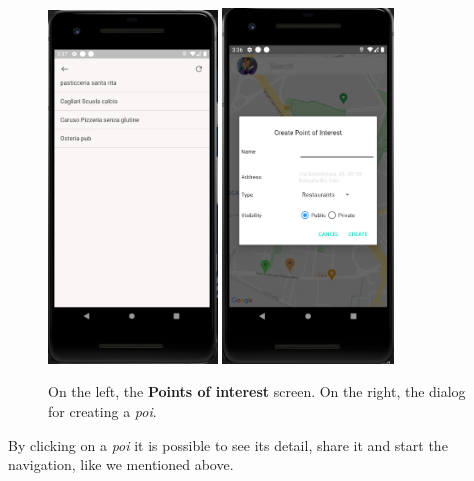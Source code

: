 \documentclass[../../main]{subfiles}
\begin{document}
\begin{figure}[H]
    \centering
    \includegraphics[width=0.4\textwidth]{images/app/poi/poi_overview}
    \includegraphics[width=0.405\textwidth]{images/app/poi/creazione_poi}
    \caption{On the left, the \textbf{Points of interest} screen. On the right, the dialog for creating a \textit{poi}.}
\end{figure}
\noindent
By clicking on a \textit{poi} it is possible to see its detail, share it and start the navigation, like we mentioned above.
\end{document}
